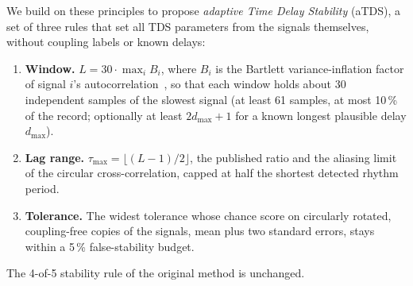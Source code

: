 \documentclass[11pt,a4paper]{article}
\begin{document}
We build on these principles to propose \emph{adaptive Time Delay Stability} (aTDS), a set of three rules that set all TDS parameters from the signals themselves, without coupling labels or known delays:
\begin{enumerate}
\item \textbf{Window.} $L = 30 \cdot \max_i B_i$, where $B_i$ is the Bartlett variance-inflation factor of signal $i$'s autocorrelation~\cite{Bartlett1946TheoreticalSpecification}, so that each window holds about 30 independent samples of the slowest signal (at least 61 samples, at most 10\,\% of the record; optionally at least $2 d_{\max} + 1$ for a known longest plausible delay $d_{\max}$).
\item \textbf{Lag range.} $\tau_{\max} = \lfloor (L-1)/2 \rfloor$, the published ratio and the aliasing limit of the circular cross-correlation, capped at half the shortest detected rhythm period.
\item \textbf{Tolerance.} The widest tolerance whose chance score on circularly rotated, coupling-free copies of the signals, mean plus two standard errors, stays within a 5\,\% false-stability budget.
\end{enumerate}
The 4-of-5 stability rule of the original method is unchanged.
\end{document}
